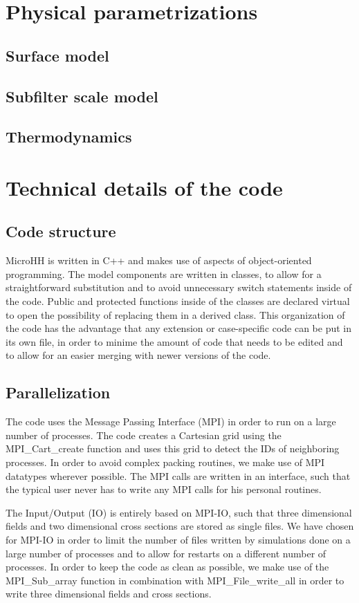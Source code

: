 \documentclass[gmd]{copernicus}
\begin{document}
\section{Physical parametrizations}
\subsection{Surface model}
\subsection{Subfilter scale model}
\subsection{Thermodynamics}

\section{Technical details of the code}\label{sec:technical}
\subsection{Code structure}
MicroHH is written in C++ and makes use of aspects of object-oriented programming. The model components are written in classes, to allow for a straightforward substitution and to avoid unnecessary switch statements inside of the code. Public and protected functions inside of the classes are declared virtual to open the possibility of replacing them in a derived class. This organization of the code has the advantage that any extension or case-specific code can be put in its own file, in order to minime the amount of code that needs to be edited and to allow for an easier merging with newer versions of the code.

\subsection{Parallelization}
The code uses the Message Passing Interface (MPI) in order to run on a large number of processes. The code creates a Cartesian grid using the MPI\_Cart\_create function and uses this grid to detect the IDs of neighboring processes. In order to avoid complex packing routines, we make use of MPI datatypes wherever possible. The MPI calls are written in an interface, such that the typical user never has to write any MPI calls for his personal routines.

The Input/Output (IO) is entirely based on MPI-IO, such that three dimensional fields and two dimensional cross sections are stored as single files. We have chosen for MPI-IO in order to limit the number of files written by simulations done on a large number of processes and to allow for restarts on a different number of processes. In order to keep the code as clean as possible, we make use of the MPI\_Sub\_array function in combination with MPI\_File\_write\_all in order to write three dimensional fields and cross sections.
\end{document}

